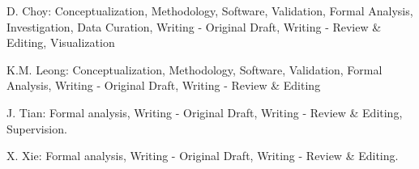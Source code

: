 \documentclass[lineno,pdflatex,sn-mathphys-num]{sn-jnl}%
\theoremstyle{thmstyleone}%
\theoremstyle{thmstyletwo}%
\theoremstyle{thmstylethree}%
\begin{document}
D. Choy: Conceptualization, Methodology, Software, Validation, Formal Analysis, Investigation, Data Curation, Writing - Original Draft, Writing - Review \& Editing, Visualization

K.M. Leong: Conceptualization, Methodology, Software, Validation, Formal Analysis, Writing - Original Draft, Writing - Review \& Editing

J. Tian: Formal analysis, Writing - Original Draft, Writing - Review \& Editing, Supervision.

X. Xie: Formal analysis, Writing - Original Draft, Writing - Review \& Editing.



\end{document}
